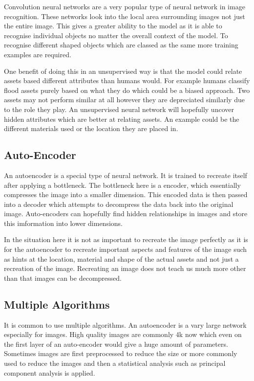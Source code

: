 \documentclass{article}
\begin{document}
Convolution neural networks are a very popular type of neural network in image recognition. These networks look into the local area surrounding images not just the entire image. This gives a greater ability to the model as it is able to recognise individual objects no matter the overall context of the model. To recognise different shaped objects which are classed as the same more training examples are required.

One benefit of doing this in an unsupervised way is that the model could relate assets based different attributes than humans would. For example humans classify flood assets purely based on what they do which could be a biased approach. Two assets may not perform similar at all however they are depreciated similarly due to the role they play. An unsupervised neural network will hopefully uncover hidden attributes which are better at relating assets. An example could be the different materials used or the location they are placed in.

\subsection{Auto-Encoder}
\label{ss:ae}
An autoencoder is a special type of neural network. It is trained to recreate itself after applying a bottleneck. The bottleneck here is a encoder, which essentially compresses the image into a smaller dimension. This encoded data is then passed into a decoder which attempts to decompress the data back into the original image. Auto-encoders can hopefully find hidden relationships in images and store this imformation into lower dimensions.

In the situation here it is not as important to recreate the image perfectly as it is for the autoencoder to recreate important aspects and features of the image such as hints at the location, material and shape of the actual assets and not just a recreation of the image. Recreating an image does not teach us much more other than that images can be decompressed.

\subsection{Multiple Algorithms}
\label{ss:ma}
It is common to use multiple algorithms. An autoencoder is a vary large network especially for images. High quality images are commonly 4k now which even on the first layer of an auto-encoder would give a huge amount of parameters. Sometimes images are first preprocessed to reduce the size or more commonly used to reduce the images and then a statistical analysis such as principal component analysis is applied.
\end{document}
